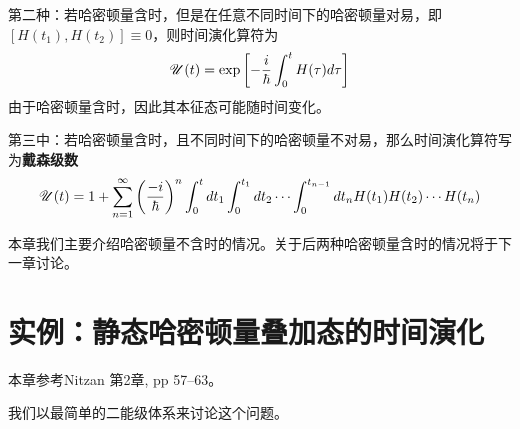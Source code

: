 第二种：若哈密顿量含时，但是在任意不同时间下的哈密顿量对易，即$ [H(t_1),H(t_2)]\equiv0 $，则时间演化算符为
\begin{equation}\label{key}
\mathscr{U}(t)=\exp\left[-\dfrac{i}{\hbar}\int_0^t H(\tau)d\tau\right]
\end{equation}
由于哈密顿量含时，因此其本征态可能随时间变化。

第三中：若哈密顿量含时，且不同时间下的哈密顿量不对易，那么时间演化算符写为\textbf{戴森级数}
\begin{equation}\label{key}
\mathscr{U}(t)=1+\sum_{n=1}^\infty\left(\dfrac{-i}{\hbar}\right)^n\int_0^tdt_1\int_0^{t_1}dt_2\cdots\int_0^{t_{n-1}}dt_n H(t_1)H(t_2)\cdots H(t_n)
\end{equation}

本章我们主要介绍哈密顿量不含时的情况。关于后两种哈密顿量含时的情况将于下一章讨论。

\section{实例：静态哈密顿量叠加态的时间演化}
\begin{framed}
本章参考Nitzan 第2章, pp 57--63。	
\end{framed}

我们以最简单的二能级体系来讨论这个问题。

